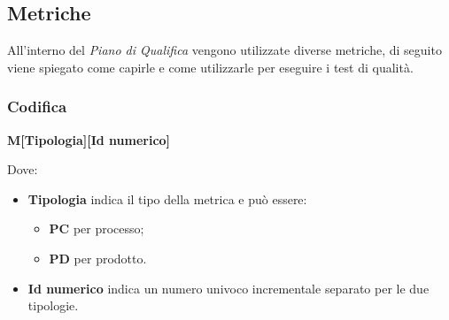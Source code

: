   \subsection{Metriche}\label{sec:metriche}
  All'interno del \textit{Piano di Qualifica} vengono utilizzate diverse metriche, di seguito viene spiegato come capirle e come utilizzarle per
  eseguire i test di qualità.
  \subsubsection{Codifica}
  \begin{center}
      \textbf{M[Tipologia][Id numerico]}
  \end{center}
  Dove:
    \begin{itemize}
        \item \textbf{Tipologia} indica il tipo della metrica e può essere: 
                \begin{itemize}
                    \item \textbf{PC} per processo;
                    \item \textbf{PD} per prodotto.
                \end{itemize}
        \item \textbf{Id numerico} indica un numero univoco incrementale separato per le due tipologie.
    \end{itemize}
